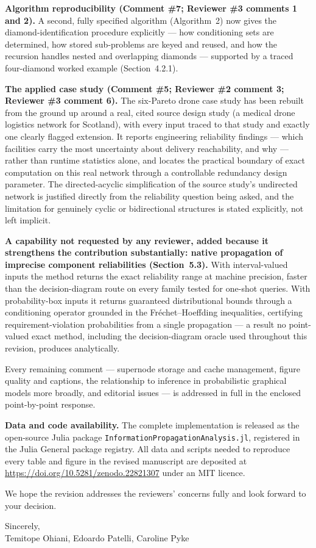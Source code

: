 \documentclass[11pt]{article}
\begin{document}
\textbf{Algorithm reproducibility (Comment \#7; Reviewer \#3 comments 1 and 2).} A second, fully specified algorithm (Algorithm~2) now gives the diamond-identification procedure explicitly --- how conditioning sets are determined, how stored sub-problems are keyed and reused, and how the recursion handles nested and overlapping diamonds --- supported by a traced four-diamond worked example (Section~4.2.1).

\textbf{The applied case study (Comment \#5; Reviewer \#2 comment 3; Reviewer \#3 comment 6).} The six-Pareto drone case study has been rebuilt from the ground up around a real, cited source design study (a medical drone logistics network for Scotland), with every input traced to that study and exactly one clearly flagged extension. It reports engineering reliability findings --- which facilities carry the most uncertainty about delivery reachability, and why --- rather than runtime statistics alone, and locates the practical boundary of exact computation on this real network through a controllable redundancy design parameter. The directed-acyclic simplification of the source study's undirected network is justified directly from the reliability question being asked, and the limitation for genuinely cyclic or bidirectional structures is stated explicitly, not left implicit.

\textbf{A capability not requested by any reviewer, added because it strengthens the contribution substantially: native propagation of imprecise component reliabilities (Section~5.3).} With interval-valued inputs the method returns the exact reliability range at machine precision, faster than the decision-diagram route on every family tested for one-shot queries. With probability-box inputs it returns guaranteed distributional bounds through a conditioning operator grounded in the Fr\'echet--Hoeffding inequalities, certifying requirement-violation probabilities from a single propagation --- a result no point-valued exact method, including the decision-diagram oracle used throughout this revision, produces analytically.

Every remaining comment --- supernode storage and cache management, figure quality and captions, the relationship to inference in probabilistic graphical models more broadly, and editorial issues --- is addressed in full in the enclosed point-by-point response.

\textbf{Data and code availability.} The complete implementation is released as the open-source Julia package \texttt{InformationPropagationAnalysis.jl}, registered in the Julia General package registry. All data and scripts needed to reproduce every table and figure in the revised manuscript are deposited at \url{https://doi.org/10.5281/zenodo.22821307} under an MIT licence.

We hope the revision addresses the reviewers' concerns fully and look forward to your decision.

\bigskip
\noindent Sincerely,\\
Temitope Ohiani, Edoardo Patelli, Caroline Pyke
\end{document}
